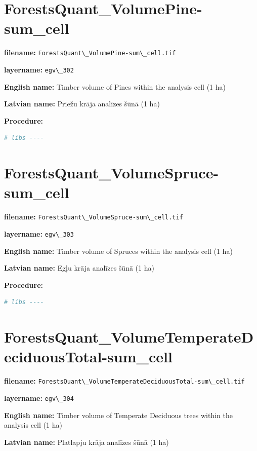 \documentclass[
]{book}
\newcommand{\passthrough}[1]{#1}
\begin{document}
\section{ForestsQuant\_VolumePine-sum\_cell}\label{ch06.302}

\textbf{filename:} \passthrough{\lstinline!ForestsQuant\_VolumePine-sum\_cell.tif!}

\textbf{layername:} \passthrough{\lstinline!egv\_302!}

\textbf{English name:} Timber volume of Pines within the analysis cell (1 ha)

\textbf{Latvian name:} Priežu krāja analīzes šūnā (1 ha)

\textbf{Procedure:}

\begin{lstlisting}[language=R]
# libs ----
\end{lstlisting}

\section{ForestsQuant\_VolumeSpruce-sum\_cell}\label{ch06.303}

\textbf{filename:} \passthrough{\lstinline!ForestsQuant\_VolumeSpruce-sum\_cell.tif!}

\textbf{layername:} \passthrough{\lstinline!egv\_303!}

\textbf{English name:} Timber volume of Spruces within the analysis cell (1 ha)

\textbf{Latvian name:} Egļu krāja analīzes šūnā (1 ha)

\textbf{Procedure:}

\begin{lstlisting}[language=R]
# libs ----
\end{lstlisting}

\section{ForestsQuant\_VolumeTemperateDeciduousTotal-sum\_cell}\label{ch06.304}

\textbf{filename:} \passthrough{\lstinline!ForestsQuant\_VolumeTemperateDeciduousTotal-sum\_cell.tif!}

\textbf{layername:} \passthrough{\lstinline!egv\_304!}

\textbf{English name:} Timber volume of Temperate Deciduous trees within the analysis cell (1 ha)

\textbf{Latvian name:} Platlapju krāja analīzes šūnā (1 ha)
\end{document}
